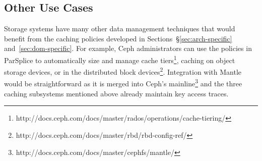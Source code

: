 %

\subsection{Other Use Cases}

Storage systems have many other data management techniques that would benefit
from the caching policies developed in Sections~\S\ref{sec:arch-specific}
and~\ref{sec:dom-specific}. For example, Ceph administrators can use the
policies in ParSplice to automatically size and manage cache
tiers\footnote{http://docs.ceph.com/docs/master/rados/operations/cache-tiering/},
caching on object storage devices, or in the distributed block
devices\footnote{http://docs.ceph.com/docs/master/rbd/rbd-config-ref/}.
Integration with Mantle would be straightforward as it is merged into Ceph's
mainline\footnote{http://docs.ceph.com/docs/master/cephfs/mantle/} and the
three caching subsystems mentioned above already maintain key access traces. 

